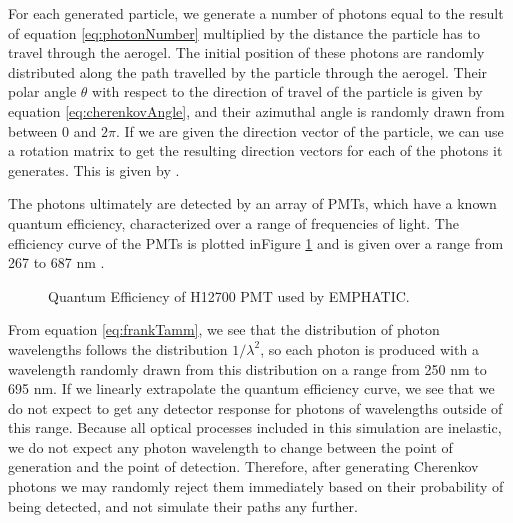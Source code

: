 For each generated particle, we generate a number of photons equal to the result of equation \ref{eq:photonNumber} multiplied by the distance the particle has to travel through the aerogel.
The initial position of these photons are randomly distributed along the path travelled by the particle through the aerogel.
Their polar angle $\theta$ with respect to the direction of travel of the particle is given by equation \ref{eq:cherenkovAngle}, and their azimuthal angle is randomly drawn from between 0 and $2\pi$.
If we are given the direction vector of the particle, we can use a rotation matrix to get the resulting direction vectors for each of the photons it generates.
This is given by .

The photons ultimately are detected by an array of PMTs, which have a known quantum efficiency, characterized over a range of frequencies of light.
The efficiency curve of the PMTs is plotted inFigure \ref{fig:qEff} and is given over a range from 267 to 687 nm   .

\begin{figure}[]
\centering
{}
\caption[Quantum Efficiency of H12700 PMT used by EMPHATIC.]{Quantum Efficiency of H12700 PMT used by EMPHATIC.}
\label{fig:qEff} 
\end{figure}

From equation \ref{eq:frankTamm}, we see that the distribution of photon wavelengths follows the distribution $1/\lambda^2$, so each photon is produced with a wavelength randomly drawn from this distribution on a range from 250 nm to 695 nm.
If we linearly extrapolate the quantum efficiency curve, we see that we do not expect to get any detector response for photons of wavelengths outside of this range.
Because all optical processes included in this simulation are inelastic, we do not expect any photon wavelength to change between the point of generation and the point of detection.
Therefore, after generating Cherenkov photons we may randomly reject them immediately based on their probability of being detected, and not simulate their paths any further.

